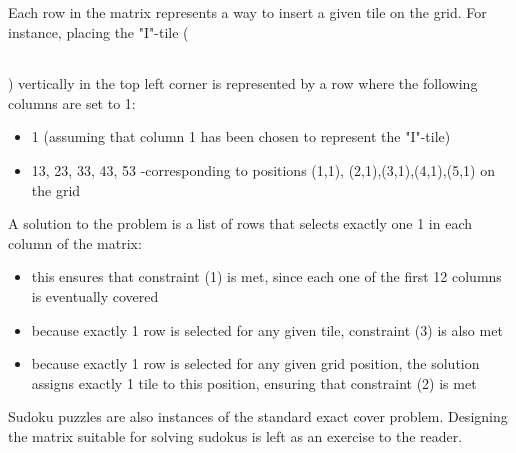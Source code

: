 \documentclass[table]{article}
\begin{document}
Each row in the matrix represents a way to insert a given tile on the grid. For instance, placing the "I"-tile ({\footnotesize \begin{tabular}{|c|c|c|c|c|}\hline\hspace{1em}&\hspace{1em}&\hspace{1em}&\hspace{1em}&\hspace{1em}\\\hline\end{tabular}}) vertically in the top left corner is represented by a row where the following columns are set to 1:
\begin{itemize}
	\item 1 (assuming that column 1 has been chosen to represent the "I"-tile)
	\item 13, 23, 33, 43, 53 -corresponding to positions (1,1), (2,1),(3,1),(4,1),(5,1) on the grid
\end{itemize}

A solution to the problem is a list of rows that selects exactly one 1 in each column of the matrix:
	\begin{itemize}
	\item this ensures that constraint (1) is met, since each one of the first 12 columns is eventually covered
	\item because exactly 1 row is selected for any given tile, constraint (3) is also met
	\item because exactly 1 row is selected for any given grid position, the solution assigns exactly 1 tile to this position, ensuring that constraint (2) is met
	\end{itemize}


Sudoku puzzles are also instances of the standard exact cover problem. Designing the matrix suitable for solving sudokus is left as an exercise to the reader.
\end{document}
